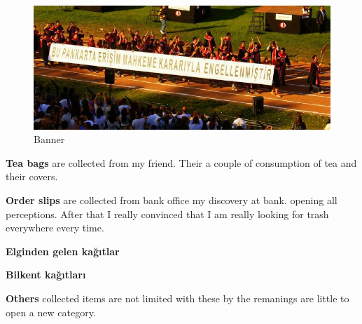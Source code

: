 \begin{figure}[h!]
  \centering
  \includegraphics[width=1\textwidth]{project_graphics/banner1.jpg}
  \caption{Banner}
  \label{fig:Banner_1}
\end{figure}

\textbf{Tea bags} are collected from my friend. Their a couple of consumption of tea and their covers.

\textbf{Order slips} are collected from bank office my discovery at bank. opening all perceptions. After that I really convinced that I am really looking for trash everywhere every time.

\textbf{Elginden gelen kağıtlar}

\textbf{Bilkent kağıtları} %

\textbf{Others} collected items are not limited with these by the remanings are little to open a new category.










